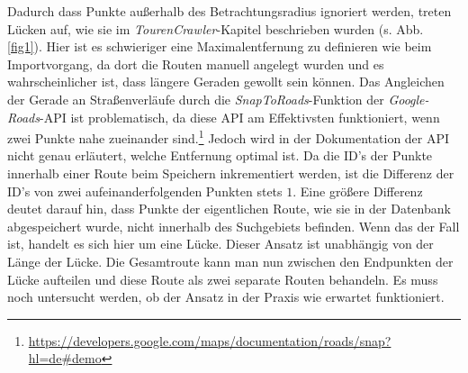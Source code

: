 \documentclass[a4paper,11pt,utf8]{scrartcl}
\begin{document}
Dadurch dass Punkte außerhalb des Betrachtungsradius ignoriert werden, treten \glqq Lücken\grqq{} auf, wie sie im \textit{TourenCrawler}-Kapitel beschrieben wurden (s. Abb. \ref{fig1}). Hier ist es schwieriger eine Maximalentfernung zu definieren wie beim Importvorgang, da dort die Routen manuell angelegt wurden und es wahrscheinlicher ist, dass längere Geraden gewollt sein können. Das Angleichen der Gerade an Straßenverläufe durch die \textit{SnapToRoads}-Funktion der \textit{Google-Roads}-API ist problematisch, da diese API am Effektivsten funktioniert, wenn zwei Punkte nahe zueinander sind.\footnote{\url{https://developers.google.com/maps/documentation/roads/snap?hl=de\#demo}} Jedoch wird in der Dokumentation der API nicht genau erläutert, welche Entfernung optimal ist. Da die ID's der Punkte innerhalb einer Route beim Speichern inkrementiert werden, ist die Differenz der ID's von zwei aufeinanderfolgenden Punkten stets $1$. Eine größere Differenz deutet darauf hin, dass Punkte der eigentlichen Route, wie sie in der Datenbank abgespeichert wurde, nicht innerhalb des Suchgebiets befinden. Wenn das der Fall ist, handelt es sich hier um eine Lücke. Dieser Ansatz ist unabhängig von der Länge der Lücke. Die Gesamtroute kann man nun zwischen den Endpunkten der Lücke aufteilen und diese Route als zwei separate Routen behandeln. Es muss noch untersucht werden, ob der Ansatz in der Praxis wie erwartet funktioniert.
\end{document}
